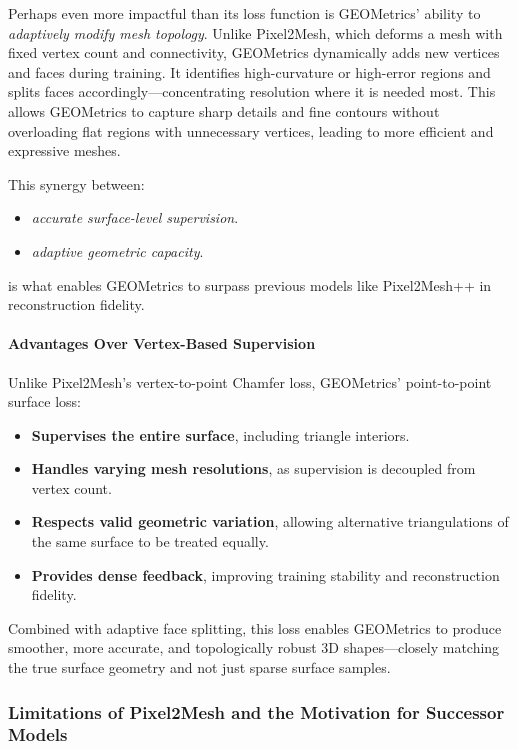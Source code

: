 \begin{enrichment}
    Perhaps even more impactful than its loss function is GEOMetrics' ability to \emph{adaptively modify mesh topology}. Unlike Pixel2Mesh, which deforms a mesh with fixed vertex count and connectivity, GEOMetrics dynamically adds new vertices and faces during training. It identifies high-curvature or high-error regions and splits faces accordingly—concentrating resolution where it is needed most. This allows GEOMetrics to capture sharp details and fine contours without overloading flat regions with unnecessary vertices, leading to more efficient and expressive meshes.
    
    This synergy between:
    \begin{itemize}
        \item \emph{accurate surface-level supervision}.
        \item \emph{adaptive geometric capacity}.
    \end{itemize}
    is what enables GEOMetrics to surpass previous models like Pixel2Mesh++ in reconstruction fidelity.
    
    \paragraph{Advantages Over Vertex-Based Supervision}
    
    Unlike Pixel2Mesh’s vertex-to-point Chamfer loss, GEOMetrics’ point-to-point surface loss:
    \begin{itemize}
        \item \textbf{Supervises the entire surface}, including triangle interiors.
        \item \textbf{Handles varying mesh resolutions}, as supervision is decoupled from vertex count.
        \item \textbf{Respects valid geometric variation}, allowing alternative triangulations of the same surface to be treated equally.
        \item \textbf{Provides dense feedback}, improving training stability and reconstruction fidelity.
    \end{itemize}
    
    Combined with adaptive face splitting, this loss enables GEOMetrics to produce smoother, more accurate, and topologically robust 3D shapes—closely matching the true surface geometry and not just sparse surface samples.
    
\end{enrichment}

\subsubsection{Limitations of Pixel2Mesh and the Motivation for Successor Models}
\label{subsubsec:chapter23_pixel2mesh_limitations}


